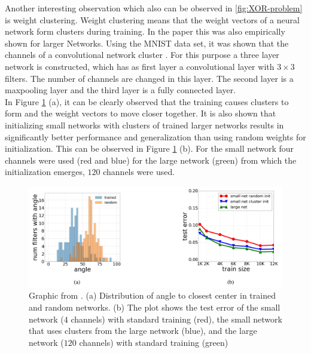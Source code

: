 Another interesting observation which also can be observed in \ref{fig:XOR-problem} is weight clustering. Weight clustering means that the weight vectors of a neural network form clusters during training. In the paper this was also empirically shown for larger Networks. Using the MNIST data set, it was shown that the channels of a convolutional network cluster \cite{pmlr-v97-brutzkus19b}. For this purpose a three layer network is constructed, which has as first layer a convolutional layer with $3 \times 3$ filters. The number of channels are changed in this layer. The second layer is a maxpooling layer and the third layer is a fully connected layer.\\
In Figure \ref{fig:brutzkus19b} (a), it can be clearly observed that the training causes clusters to form and the weight vectors to move closer together. It is also shown that initializing small networks with clusters of trained larger networks results in significantly better performance and generalization than using random weights for initialization. This can be observed in Figure \ref{fig:brutzkus19b} (b). For the small network four channels were used (red and blue) for the large network (green) from which the initialization emerges, $120$ channels were used. 
  



\begin{figure}[!htp]
\centering
\includegraphics[scale=0.2]{Abschlussarbeit_2021/LaTeX/images/clustering.PNG}
\caption{ Graphic from \cite{pmlr-v97-brutzkus19b}. 
(a) Distribution of angle to closest center in trained and random networks. (b) The plot
shows the test error of the small network ($4$ channels) with standard training (red), the small network that uses clusters from the large network (blue), and the large network ($120$ channels) with standard training (green)}
\label{fig:brutzkus19b}
\end{figure}





